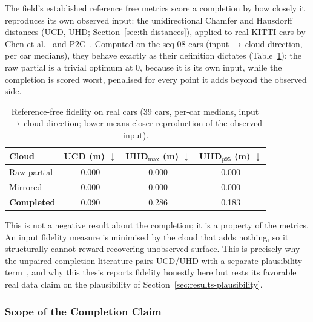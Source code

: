 \documentclass[a4paper,12pt]{report}
\begin{document}
The field's established reference free metrics score a completion by how closely it reproduces
its own observed input: the unidirectional Chamfer and Hausdorff distances (UCD, UHD;
Section~\ref{sec:th-distances}), applied to real KITTI cars by Chen et
al.~\cite{chen2020unpaired} and P2C~\cite{cui2023p2c}. Computed on the seq-08 cars
(input\,$\to$\,cloud direction, per car medians), they behave exactly as their definition
dictates (Table~\ref{tab:fidelity}): the raw partial is a trivial optimum at \num{0}, because
it is its own input, while the completion is scored worst, penalised for every point it
adds beyond the observed side.

\begin{table}[H]
  \centering
  \caption[Reference free fidelity metrics]{Reference-free fidelity on real cars (\num{39}
    cars, per-car medians, input\,$\to$\,cloud direction; lower means closer reproduction of
    the observed input).}
  \label{tab:fidelity}
  \begin{tabular}{lccc}
    \toprule
    Cloud & UCD (m) $\downarrow$ & UHD$_{\max}$ (m) $\downarrow$ & UHD$_{p95}$ (m) $\downarrow$ \\
    \midrule
    Raw partial        & 0.000 & 0.000 & 0.000 \\
    Mirrored           & 0.000 & 0.000 & 0.000 \\
    \textbf{Completed} & 0.090 & 0.286 & 0.183 \\
    \bottomrule
  \end{tabular}
\end{table}

This is not a negative result about the completion; it is a property of the metrics. An
input fidelity measure is minimised by the cloud that adds nothing, so it structurally cannot
reward recovering unobserved surface. This is precisely why the unpaired completion literature
pairs UCD/UHD with a separate plausibility term~\cite{chen2020unpaired}, and why this thesis
reports fidelity honestly here but rests its favorable real data claim on the plausibility of
Section~\ref{sec:results-plausibility}.

\subsubsection{Scope of the Completion Claim}
\label{sec:results-completion-scope}
\end{document}
